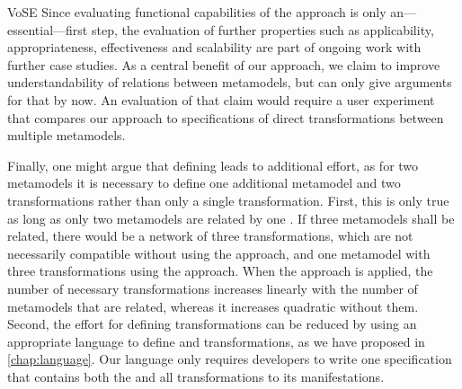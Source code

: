 \begin{copiedFrom}{VoSE}
Since evaluating functional capabilities of the approach is only an---essential---first step, the evaluation of further properties such as applicability, appropriateness, effectiveness and scalability are part of ongoing work with further case studies.
As a central benefit of our approach, we claim to improve understandability of relations between metamodels, but can only give arguments for that by now.
An evaluation of that claim would require a user experiment that compares our approach to specifications of direct transformations between multiple metamodels.

Finally, one might argue that defining \conceptmetamodels leads to additional effort, as for two metamodels it is necessary to define one additional metamodel and two transformations rather than only a single transformation.
First, this is only true as long as only two metamodels are related by one \conceptmetamodel. 
If three metamodels shall be related, there would be a network of three transformations, which are not necessarily compatible without using the \commonalities approach, and one metamodel with three transformations using the \commonalities approach.
When the \commonalities approach is applied, the number of necessary transformations increases linearly with the number of metamodels that are related, whereas it increases quadratic without them.
Second, the effort for defining transformations can be reduced by using an appropriate language to define \conceptmetamodels and transformations, as we have proposed in \autoref{chap:language}. Our language only requires developers to write one specification that contains both the \conceptmetamodel and all transformations to its manifestations.


\end{copiedFrom} %
